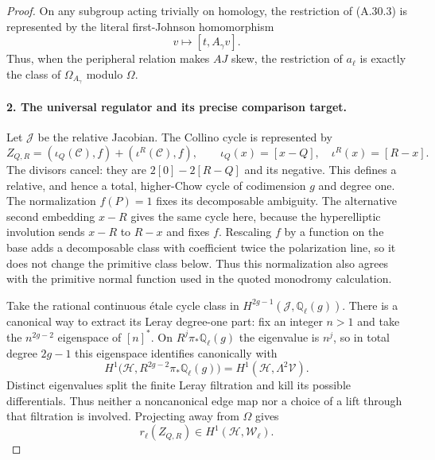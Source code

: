 \begin{proof}
On any subgroup acting trivially on homology, the
restriction of (A.30.3) is represented by the literal
first-Johnson homomorphism
\[
                  v\longmapsto[t,A_\gamma v].
                                                        \tag{A.30.5}
\]
Thus, when the peripheral relation makes $AJ$ skew,
the restriction of $a_\ell$ is exactly the class of
$\Omega_{A_\gamma}$ modulo $\Omega$.

\paragraph{2. The universal regulator and its precise comparison target.}
Let $\mathcal J$ be the relative Jacobian. The
Collino cycle is represented by
\[
 Z_{Q,R}=(\iota_Q(\mathcal C),f)
                  +(\iota^R(\mathcal C),f),\qquad
 \iota_Q(x)=[x-Q],\quad \iota^R(x)=[R-x].
                                                        \tag{A.30.6}
\]
The divisors cancel: they are $2[0]-2[R-Q]$ and its
negative. This defines a relative, and hence a total,
higher-Chow cycle of codimension $g$ and degree one.
The normalization $f(P)=1$ fixes its decomposable
ambiguity. The alternative second embedding $x-R$
gives the same cycle here, because the hyperelliptic
involution sends $x-R$ to $R-x$ and fixes $f$.
Rescaling $f$ by a function on the base adds a
decomposable class with coefficient twice the
polarization line, so it does not change the
primitive class below. Thus this normalization
also agrees with the primitive normal function
used in the quoted monodromy calculation.

Take the rational continuous \'etale cycle class in
$H^{2g-1}(\mathcal J,\mathbb Q_\ell(g))$. There is a
canonical way to extract its Leray degree-one part:
fix an integer $n>1$ and take the $n^{2g-2}$
eigenspace of $[n]^*$. On
$R^j\pi_*\mathbb Q_\ell(g)$ the eigenvalue is $n^j$,
so in total degree $2g-1$ this eigenspace identifies
canonically with
\[
 H^1\bigl(\mathcal H,
          R^{2g-2}\pi_*\mathbb Q_\ell(g)\bigr)
       =H^1(\mathcal H,\Lambda^2\mathcal V).
\]
Distinct eigenvalues split the finite Leray
filtration and kill its possible differentials.
Thus neither a noncanonical edge map nor a
choice of a lift through that filtration is involved.
Projecting away from $\Omega$ gives
\[
                    r_\ell(Z_{Q,R})
                      \in H^1(\mathcal H,\mathcal W_\ell).
                                                        \tag{A.30.7}
\]


\end{proof}
